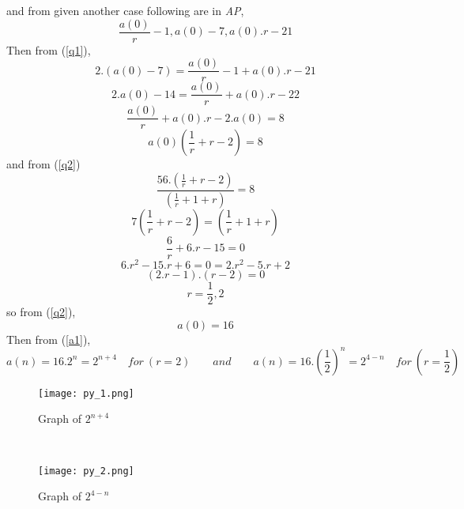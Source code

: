\documentclass{article}
\begin{document}
and from given another case following are in \textit{AP},
\[\frac{a(0)}{r}-1,a(0)-7,a(0).r-21\]
Then from (\ref{q1}),
\[2.(a(0)-7)=\frac{a(0)}{r}-1+a(0).r-21\]
\[2.a(0)-14=\frac{a(0)}{r}+a(0).r-22\]
\[\frac{a(0)}{r}+a(0).r-2.a(0)=8\]
\[a(0)\left(\frac{1}{r}+r-2\right)=8\]
and from (\ref{q2})
\[\frac{56.\left(\frac{1}{r}+r-2\right)}{\left(\frac{1}{r}+1+r\right)}=8\]
\[7\left(\frac{1}{r}+r-2\right)=\left(\frac{1}{r}+1+r\right)\]
\[\frac{6}{r}+6.r-15=0\]
\[6.r^2-15.r+6=0=2.r^2-5.r+2\]
\[(2.r-1).(r-2)=0\]
\begin{equation}
\label{q3}
r=\frac{1}{2},2
\end{equation}
so from (\ref{q2}),
\[a(0)=16\]
Then from (\ref{a1}),
$$a(n)=16.2^n=2^{n+4}\quad for\ (r=2)\qquad and\qquad  a(n)=16.\left(\frac{1}{2}\right)^n=2^{4-n}\quad for\ (r=\frac{1}{2})$$
\begin{figure}
    \centering
    \texttt{[image: py\_1.png]}
    \caption{Graph of $2^{n+4}$}
    \label{fig:enter-label}
\end{figure}\\
\begin{figure}
    \centering
    \texttt{[image: py\_2.png]}
    \caption{Graph of $2^{4-n}$}
    \label{fig:enter-label}
\end{figure}
\end{document}
